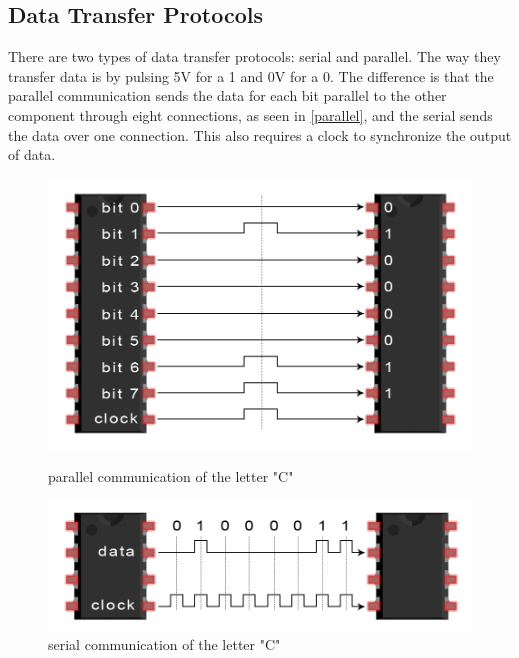 \documentclass[svgnames]{article}
\begin{document}
	\subsection{Data Transfer Protocols}
	There are two types of data transfer protocols: serial and parallel. The way they transfer data is by pulsing 5V for a 1 and 0V for a 0. The difference is that the parallel communication sends the data for each bit parallel to the other component through eight connections, as seen in \cref{parallel}, and the serial sends the data over one connection. This also requires a clock to synchronize the output of data.
	\begin{figure}[ht]
		\centering
		\begin{minipage}[c]{0.4\textwidth}
			\includegraphics[width=\textwidth]{pictures/SPIparallel}
			\caption{parallel communication of the letter "C" \cite{spiprotocol}}
			\label{parallel}
		\end{minipage}
		\hfill
		\begin{minipage}[c]{0.4\textwidth}
			\includegraphics[width=\textwidth]{pictures/SPIserial}
			\caption{serial communication of the letter "C" \cite{spiprotocol}}
			\label{serial}
		\end{minipage}
	\end{figure}
	
\end{document}
